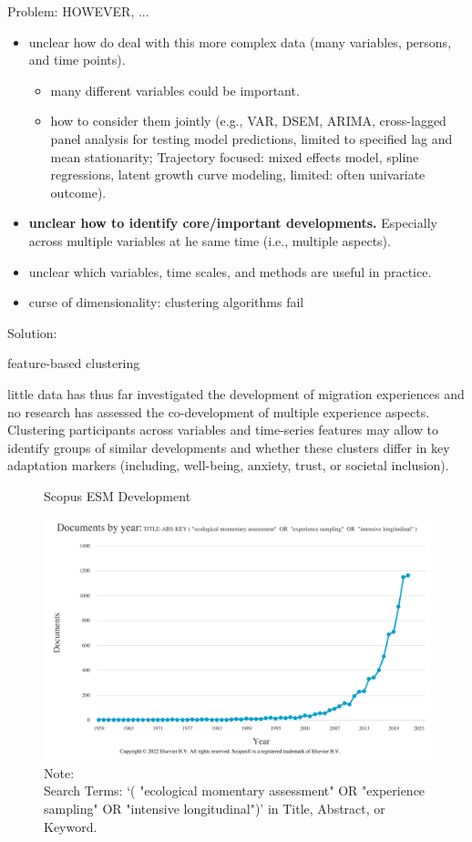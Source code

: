 \documentclass[man, 12pt, a4paper]{apa7}
\theoremstyle{break}
\theoremstyle{plain}
\begin{document}
Problem: HOWEVER, ...

\begin{itemize}
    \item unclear how do deal with this more complex data (many variables, persons, and time points).
    \begin{itemize}
        \item many different variables could be important.
        \item how to consider them jointly (e.g., VAR, DSEM, ARIMA, cross-lagged panel analysis for testing model predictions, limited to specified lag and mean stationarity; Trajectory focused: mixed effects model, spline regressions, latent growth curve modeling, limited: often univariate outcome). 
    \end{itemize}
    \item \textbf{unclear how to identify core/important developments.} Especially across multiple variables at he same time (i.e., multiple aspects).
    \item unclear which variables, time scales, and methods are useful in practice.
    \item curse of dimensionality: clustering algorithms fail 
\end{itemize}


Solution:   

feature-based clustering

little data has thus far investigated the development of migration experiences and no research has assessed the co-development of multiple experience aspects. Clustering participants across variables and time-series features may allow to identify groups of similar developments and whether these clusters differ in key adaptation markers (including, well-being, anxiety, trust, or societal inclusion).




%



\begin{figure}
  \caption{Scopus ESM Development}
  \label{fig:ScopusEsm}
  \centering\includegraphics[width=\textwidth]{figures/Scopus-ESM-Development.png}
  \caption*{Note: \\
  Search Terms: `( "ecological momentary assessment"  OR  "experience sampling"  OR  "intensive longitudinal")' in Title, Abstract, or Keyword.}
\end{figure}
\end{document}
